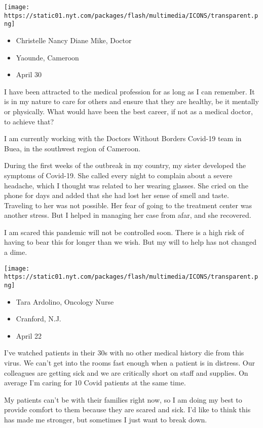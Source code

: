 \texttt{[image: https://static01.nyt.com/packages/flash/multimedia/ICONS/transparent.png]}

\begin{itemize}
\tightlist
\item
  Christelle Nancy Diane Mike, Doctor
\item
  Yaounde, Cameroon
\item
  April 30
\end{itemize}

I have been attracted to the medical profession for as long as I can
remember. It is in my nature to care for others and ensure that they are
healthy, be it mentally or physically. What would have been the best
career, if not as a medical doctor, to achieve that?

I am currently working with the Doctors Without Borders Covid-19 team in
Buea, in the southwest region of Cameroon.

During the first weeks of the outbreak in my country, my sister
developed the symptoms of Covid-19. She called every night to complain
about a severe headache, which I thought was related to her wearing
glasses. She cried on the phone for days and added that she had lost her
sense of smell and taste. Traveling to her was not possible. Her fear of
going to the treatment center was another stress. But I helped in
managing her case from afar, and she recovered.

I am scared this pandemic will not be controlled soon. There is a high
risk of having to bear this for longer than we wish. But my will to help
has not changed a dime.

\texttt{[image: https://static01.nyt.com/packages/flash/multimedia/ICONS/transparent.png]}

\begin{itemize}
\tightlist
\item
  Tara Ardolino, Oncology Nurse
\item
  Cranford, N.J.
\item
  April 22
\end{itemize}

I've watched patients in their 30s with no other medical history die
from this virus. We can't get into the rooms fast enough when a patient
is in distress. Our colleagues are getting sick and we are critically
short on staff and supplies. On average I'm caring for 10 Covid patients
at the same time.

My patients can't be with their families right now, so I am doing my
best to provide comfort to them because they are scared and sick. I'd
like to think this has made me stronger, but sometimes I just want to
break down.

